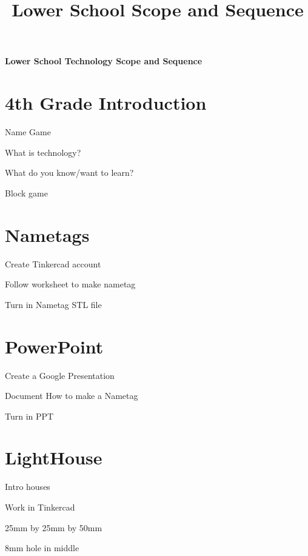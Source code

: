 \documentclass{article}
\def\FourthGradeone{Nametags}
\def\FourthGradetwo{PowerPoint}
\def\FourthGradeThree{LightHouse}
\begin{document}
	\title{Lower School Scope and Sequence}
	\begin{titlepage}
		\begin{center}
			\Huge\textbf{Lower School Technology Scope and Sequence}\\
		\end{center}
	\end{titlepage}
	

\newpage
	\section{4th Grade Introduction}
	\begin{todolist}
		\item Name Game
		\item What is technology?
		\item What do you know/want to learn?
		\item Block game
	\end{todolist}
	\section{\FourthGradeone}
	\begin{todolist}
		\item Create Tinkercad account
		\item Follow worksheet to make nametag
		\item Turn in Nametag STL file
	\end{todolist}
	\section{\FourthGradetwo}
	\begin{todolist}
		\item Create a Google Presentation
		\item Document How to make a Nametag
		\item Turn in PPT
	\end{todolist}
	\section{\FourthGradeThree}
	\begin{todolist}
		\item Intro houses
		\item Work in Tinkercad
		\item 25mm by 25mm by 50mm
		\item 8mm hole in middle 
	\end{todolist}
\end{document}
